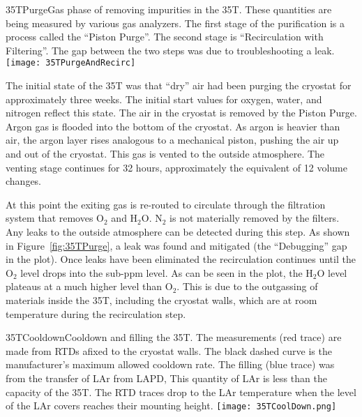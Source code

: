 \begin{cdrfigure}{35TPurge}{Gas phase of removing impurities in the 35T. These quantities are being measured by various gas analyzers. The first stage of the purification is a process called the ``Piston Purge''.  The second stage is ``Recirculation with Filtering''. The gap between the two steps was due to troubleshooting a leak.}
  \texttt{[image: 35TPurgeAndRecirc]}
\end{cdrfigure}

The initial state of the 35T was that ``dry'' air had been purging the cryostat for approximately three weeks. The initial start values for oxygen, water, and nitrogen reflect this state.
The air in the cryostat is removed by  the Piston Purge.  Argon gas is flooded into the bottom of the cryostat. As argon is heavier than air, the argon layer rises analogous to a mechanical piston, pushing the air up and out of the cryostat. This gas is vented to the outside atmosphere. The venting stage continues for 32 hours, approximately the equivalent of 12 volume changes. 

At this point the exiting gas is re-routed to circulate through the filtration system that removes O$_2$ and H$_2$O. N$_2$ is not materially removed by the filters. Any leaks to the outside atmosphere can be detected during this step. As shown in Figure~\ref{fig:35TPurge}, a leak was found and mitigated (the ``Debugging'' gap in the plot). Once leaks have been eliminated the recirculation continues until the O$_2$ level drops into the sub-ppm level. As can be seen in the plot, the H$_2$O level plateaus at a much higher level than O$_2$. This is due to the outgassing of materials inside the 35T, including the cryostat walls, which are at room temperature during the recirculation step. 


\begin{cdrfigure}{35TCooldown}{Cooldown and filling the 35T. The 
measurements (red trace) are made from RTDs afixed to the cryostat walls. The black dashed curve is the 
manufacturer's maximum allowed cooldown rate. The filling (blue trace) was from the transfer of LAr 
from LAPD, This quantity of LAr is less than the capacity of the 35T. The RTD traces drop to the LAr 
temperature when the level of the LAr covers reaches their mounting height.}
  \texttt{[image: 35TCoolDown.png]}
\end{cdrfigure}

